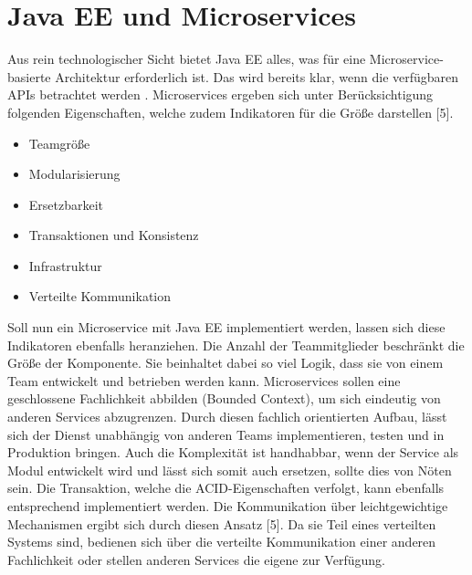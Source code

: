 \section{Java EE und Microservices}
Aus rein technologischer Sicht bietet Java EE alles, was für eine Microservice-basierte Architektur erforderlich ist. Das wird bereits klar, wenn die verfügbaren APIs betrachtet werden \cite{jaxcenter.2016}. Microservices ergeben sich unter Berücksichtigung folgenden Eigenschaften, welche zudem Indikatoren für die Größe darstellen [5].
\begin{itemize}
	\item Teamgröße
	\item Modularisierung
	\item Ersetzbarkeit
	\item Transaktionen und Konsistenz
	\item Infrastruktur
	\item Verteilte Kommunikation	
\end{itemize}
Soll nun ein Microservice mit Java EE implementiert werden, lassen sich diese Indikatoren ebenfalls heranziehen. Die Anzahl der Teammitglieder beschränkt die Größe der Komponente. Sie beinhaltet dabei so viel Logik, dass sie von einem Team entwickelt und betrieben werden kann. Microservices sollen eine geschlossene Fachlichkeit abbilden (Bounded Context), um sich eindeutig von anderen Services abzugrenzen. Durch diesen fachlich orientierten Aufbau, lässt sich der Dienst unabhängig von anderen Teams implementieren, testen und in Produktion bringen. Auch die Komplexität ist handhabbar, wenn der Service als Modul entwickelt wird und lässt sich somit auch ersetzen, sollte dies von Nöten sein. Die Transaktion, welche die ACID-Eigenschaften verfolgt, kann ebenfalls entsprechend implementiert werden. Die Kommunikation über leichtgewichtige Mechanismen ergibt sich durch diesen Ansatz [5]. Da sie Teil eines verteilten Systems sind, bedienen sich über die verteilte Kommunikation einer anderen Fachlichkeit oder stellen anderen Services die eigene zur Verfügung.  \\ 
